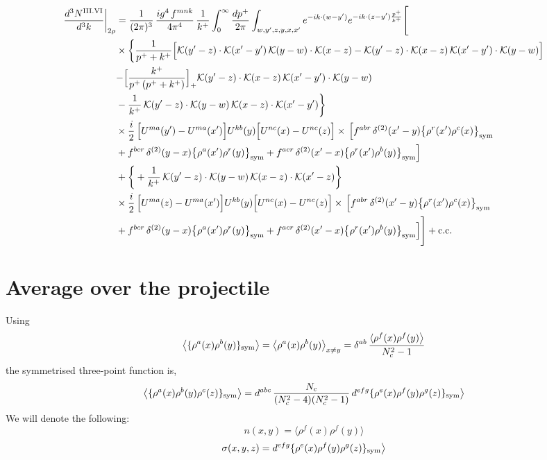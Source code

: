 \documentclass[9pt]{article}
\numberwithin{equation}{section}
\begin{document}
\begin{align}
\frac{d^{3}N^{\rm III.VI}}{d^{3}k}\bigg|_{2\rho}&=\frac{1}{(2\pi)^{3}}\,\frac{ig^{4}\,f^{mnk}}{4\pi^{4}}\,\frac{1}{k^{+}}\int_{0}^{\infty}\frac{dp^{+}}{2\pi}\int_{w,y',z,y,x,x'}e^{-ik\cdot{(w-y')}}e^{-ik\cdot{(z-y')}\frac{p^{+}}{k^{+}}}\Bigg[\notag\\
&\times\bigg\{\frac{1}{p^{+}+k^{+}}\Big[\mathcal{K}(y'-z)\cdot\mathcal{K}(x'-y')\,\mathcal{K}(y-w)\cdot\mathcal{K}(x-z)-\mathcal{K}(y'-z)\cdot\mathcal{K}(x-z)\,\mathcal{K}(x'-y')\cdot\mathcal{K}(y-w)\Big]\notag\\
&{-\Big[\frac{k^{+}}{p^{+}\,(p^{+}+k^{+})}\Big]_{+}\mathcal{K}(y'-z)\cdot\mathcal{K}(x-z)\,\mathcal{K}(x'-y')\cdot\mathcal{K}(y-w)}\notag\\
&-\frac{1}{k^{+}}\,\mathcal{K}(y'-z)\cdot\mathcal{K}(y-w)\,\mathcal{K}(x-z)\cdot\mathcal{K}(x'-y')\bigg\}\notag\\
&\times \frac{i}{2}\,\Big[U^{ma}(y')-U^{ma}(x')\Big]U^{kb}(y)\Big[U^{nc}(x)-U^{nc}(z)\Big]\times\,\Big[f^{abr}\,\delta^{(2)}(x'-y)\big\{\rho^{r}(x')\rho^{c}(x)\big\}_{\rm sym}\notag\\
& +f^{bcr}\,\delta^{(2)}(y-x)\big\{\rho^{a}(x')\rho^{r}(y)\big\}_{\rm sym} +f^{acr}\,\delta^{(2)}(x'-x)\big\{\rho^{r}(x')\rho^{b}(y)\big\}_{\rm sym}\Big]\notag\\
&+\bigg\{+\frac{1}{k^{+}}\,\mathcal{K}(y'-z)\cdot\mathcal{K}(y-w)\,\mathcal{K}(x-z)\cdot\mathcal{K}(x'-z)\bigg\}\notag\\
&\times \frac{i}{2}\,\Big[U^{ma}(z)-U^{ma}(x')\Big]U^{kb}(y)\Big[U^{nc}(x)-U^{nc}(z)\Big]\times\,\Big[f^{abr}\,\delta^{(2)}(x'-y)\big\{\rho^{r}(x')\rho^{c}(x)\big\}_{\rm sym}\notag\\
& +f^{bcr}\,\delta^{(2)}(y-x)\big\{\rho^{a}(x')\rho^{r}(y)\big\}_{\rm sym} +f^{acr}\,\delta^{(2)}(x'-x)\big\{\rho^{r}(x')\rho^{b}(y)\big\}_{\rm sym}\Big]\Bigg]+{\rm c.c.}\label{eq:D-III.VI-2}
\end{align}
\section{Average over the projectile}\label{sec:E}
Using
\begin{align}
\big\langle\{\rho^{a}(x)\rho^{b}(y)\}_{\rm sym}\big\rangle=\big\langle\rho^{a}(x)\rho^{b}(y)\big\rangle_{x\neq y}=\delta^{ab}\,\frac{\langle\rho^{f}(x)\rho^{f}(y)\big\rangle}{N_{c}^{2}-1}
\end{align}
the symmetrised three-point function is,
\begin{align}
\big\langle\{\rho^{a}(x)\rho^{b}(y)\rho^{c}(z)\}_{\rm sym}\big\rangle=d^{abc}\,\frac{N_{c}}{(N_{c}^{2}-4)(N_{c}^{2}-1)}\,d^{efg}\{\rho^{e}(x)\rho^{f}(y)\rho^{g}(z)\}_{\rm sym}\big\rangle
\end{align}
We will denote the following: 
$$n(x,y) = \langle\rho^{f}(x)\rho^{f}(y)\big\rangle$$
$$\sigma(x,y,z) = d^{efg}\{\rho^{e}(x)\rho^{f}(y)\rho^{g}(z)\}_{\rm sym}\big\rangle$$
\end{document}
